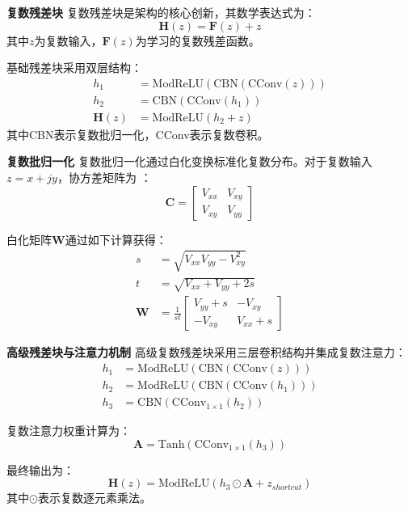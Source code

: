 \documentclass[conference]{IEEEtran}
\begin{document}
\textbf{复数残差块} 复数残差块是架构的核心创新，其数学表达式为：
\begin{equation}
\mathbf{H}(z) = \mathbf{F}(z) + z
\end{equation}
其中$z$为复数输入，$\mathbf{F}(z)$为学习的复数残差函数。

基础残差块采用双层结构：
\begin{align}
h_1 &= \text{ModReLU}(\text{CBN}(\text{CConv}(z))) \\
h_2 &= \text{CBN}(\text{CConv}(h_1)) \\
\mathbf{H}(z) &= \text{ModReLU}(h_2 + z)
\end{align}
其中CBN表示复数批归一化，CConv表示复数卷积。

\textbf{复数批归一化} 复数批归一化通过白化变换标准化复数分布。对于复数输入$z = x + jy$，协方差矩阵为 \cite{b4}：
\begin{equation}
\mathbf{C} = \begin{bmatrix} V_{xx} & V_{xy} \\ V_{xy} & V_{yy} \end{bmatrix}
\end{equation}

白化矩阵$\mathbf{W}$通过如下计算获得：
\begin{align}
s &= \sqrt{V_{xx}V_{yy} - V_{xy}^2} \\
t &= \sqrt{V_{xx} + V_{yy} + 2s} \\
\mathbf{W} &= \frac{1}{st}\begin{bmatrix} V_{yy} + s & -V_{xy} \\ -V_{xy} & V_{xx} + s \end{bmatrix}
\end{align}

\textbf{高级残差块与注意力机制} 高级复数残差块采用三层卷积结构并集成复数注意力：
\begin{align}
h_1 &= \text{ModReLU}(\text{CBN}(\text{CConv}(z))) \\
h_2 &= \text{ModReLU}(\text{CBN}(\text{CConv}(h_1))) \\
h_3 &= \text{CBN}(\text{CConv}_{1 \times 1}(h_2))
\end{align}

复数注意力权重计算为：
\begin{equation}
\mathbf{A} = \text{Tanh}(\text{CConv}_{1 \times 1}(h_3))
\end{equation}

最终输出为：
\begin{equation}
\mathbf{H}(z) = \text{ModReLU}(h_3 \odot \mathbf{A} + z_{shortcut})
\end{equation}
其中$\odot$表示复数逐元素乘法。
\end{document}
